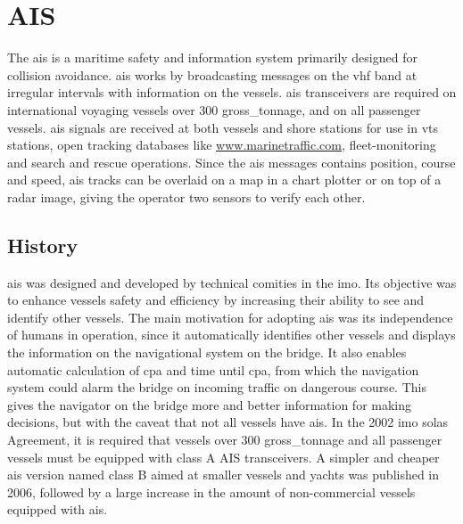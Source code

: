 \section{AIS}
The \acrfull{ais} is a maritime safety and information system primarily designed for collision avoidance. \gls{ais} works by broadcasting messages on the \gls{vhf} band at irregular intervals with information on the vessels. \gls{ais} transceivers are required on international voyaging vessels over 300 \gls{gross_tonnage}, and on all passenger vessels. \gls{ais} signals are received at both vessels and shore stations for use in \gls{vts} stations, open tracking databases like \url{www.marinetraffic.com}, fleet-monitoring and search and rescue operations. Since the \gls{ais} messages contains position, course and speed, \gls{ais} tracks can be overlaid on a map in a chart plotter or on top of a radar image, giving the operator two sensors to verify each other.

\subsection{History}
\gls{ais} was designed and developed by technical comities in the \gls{imo}. Its objective was to enhance vessels safety and efficiency by increasing their ability to see and identify other vessels. The main motivation for adopting \gls{ais} was its independence of humans in operation, since it automatically identifies other vessels and displays the information on the navigational system on the bridge. It also enables automatic calculation of \gls{cpa} and time until \gls{cpa}, from which the navigation system could alarm the bridge on incoming traffic on dangerous course. This gives the navigator on the bridge more and better information for making decisions, but with the caveat that not all vessels have \gls{ais}. In the 2002 \gls{imo} \gls{solas} Agreement, it is required that vessels over 300 \gls{gross_tonnage} and all passenger vessels must be equipped with class A AIS transceivers. A simpler and cheaper \gls{ais} version named class B aimed at smaller vessels and yachts was published in 2006, followed by a large increase in the amount of non-commercial vessels equipped with \gls{ais}.


